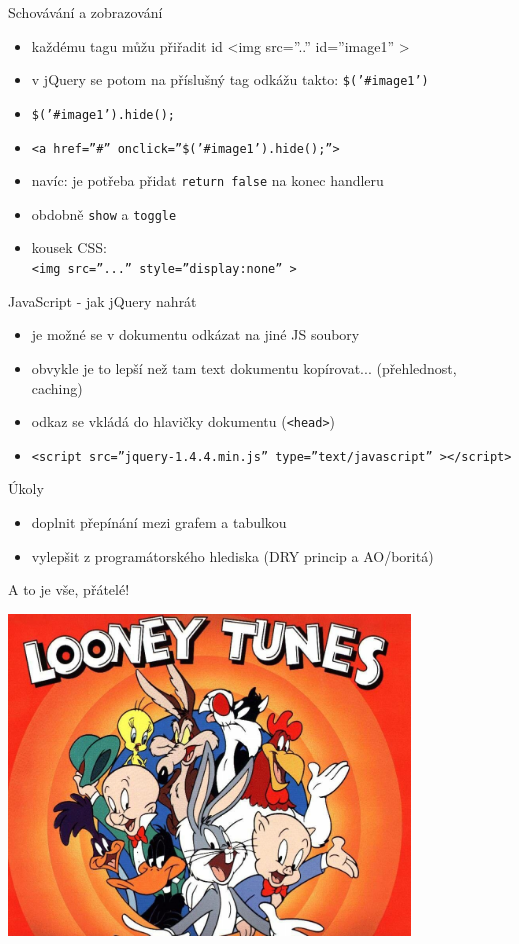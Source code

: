 \documentclass{beamer}
\begin{document}
\begin{frame}{Schovávání a zobrazování}
  \begin{itemize}
    \item každému tagu můžu přiřadit id <img src=''..'' id=''image1'' >
    \item v jQuery se potom na příslušný tag odkážu takto: \texttt{\$('\#image1')}
    \item \texttt{\$('\#image1').hide();}
    \item \texttt{<a href=''\#'' onclick=''\$('\#image1').hide();''>}
    \item navíc: je potřeba přidat \texttt{return false} na konec handleru
    \item obdobně \texttt{show} a \texttt{toggle}
    \item kousek CSS: \\ \texttt{<img src=''...'' style=''display:none'' >}
  \end{itemize}
\end{frame}

\begin{frame}{JavaScript - jak jQuery nahrát}
  \begin{itemize}
    \item je možné se v dokumentu odkázat na jiné JS soubory
    \item obvykle je to lepší než tam text dokumentu kopírovat... (přehlednost, caching)
    \item odkaz se vkládá do hlavičky dokumentu (\texttt{<head>})
    \item \texttt{<script src=''jquery-1.4.4.min.js'' type=''text/javascript'' ></script>}
  \end{itemize}
\end{frame}

\begin{frame}{Úkoly}
  \begin{itemize}
    \item doplnit přepínání mezi grafem a tabulkou
    \item vylepšit z programátorského hlediska (DRY princip a AO/boritá)
  \end{itemize}
\end{frame}

\begin{frame}{A to je vše, přátelé!}
  \begin{center}
    \includegraphics[width=0.8\textwidth]{looney_tunes}
  \end{center}
\end{frame}
\end{document}
